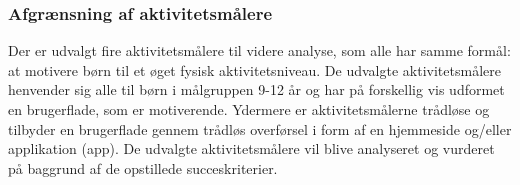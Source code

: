 \subsubsection{Afgrænsning af aktivitetsmålere}  %
Der er udvalgt fire aktivitetsmålere til videre analyse, som alle har samme formål: at motivere børn til et øget fysisk aktivitetsniveau. De udvalgte aktivitetsmålere henvender sig alle til børn i målgruppen 9-12 år og har på forskellig vis udformet en brugerflade, som er motiverende. Ydermere er aktivitetsmålerne trådløse og tilbyder en brugerflade gennem trådløs overførsel i form af en hjemmeside og/eller applikation (app). \newline
De udvalgte aktivitetsmålere vil blive analyseret og vurderet på baggrund af de opstillede succeskriterier.

